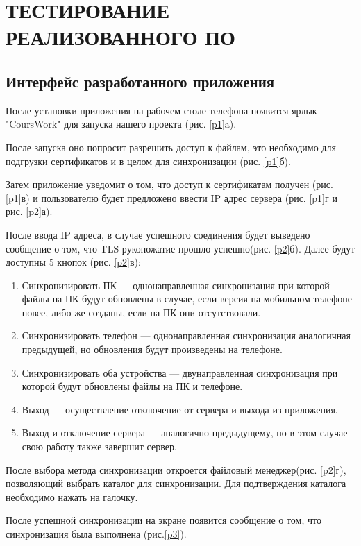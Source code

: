 \section{ТЕСТИРОВАНИЕ РЕАЛИЗОВАННОГО ПО}
\subsection{Интерфейс разработанного приложения}
После установки приложения на рабочем столе телефона появится ярлык "CoursWork" для запуска нашего проекта (рис. \ref{p1}a).

После запуска оно попросит разрешить доступ к файлам, это необходимо для подгрузки сертификатов и в целом для синхронизации (рис. \ref{p1}б).

Затем приложение уведомит о том, что доступ к сертификатам получен (рис. \ref{p1}в) и пользователю будет предложено ввести IP адрес сервера (рис. \ref{p1}г и рис. \ref{p2}а).

После ввода IP адреса, в случае успешного соединения будет выведено сообщение о том, что TLS рукопожатие прошло успешно(рис. \ref{p2}б). Далее будут доступны 5 кнопок (рис. \ref{p2}в): 
\begin{enumerate}
	\item Синхронизировать ПК --- однонаправленная синхронизация при которой файлы на ПК будут обновлены в случае, если версия на мобильном телефоне новее, либо же созданы, если на ПК они отсутствовали.
	\item Синхронизировать телефон --- однонаправленная синхронизация аналогичная предыдущей, но обновления будут произведены на телефоне.
	\item Синхронизировать оба устройства --- двунаправленная синхронизация при которой будут обновлены файлы на ПК и телефоне.
	\item Выход --- осуществление отключение от сервера и выхода из приложения.
	\item Выход и отключение сервера --- аналогично предыдущему, но в этом случае свою работу также завершит сервер.
\end{enumerate}

После выбора метода синхронизации откроется файловый менеджер(рис. \ref{p2}г), позволяющий выбрать каталог для синхронизации. Для подтверждения каталога необходимо нажать на галочку.

После успешной синхронизации на экране появится сообщение о том, что синхронизация была выполнена (рис.\ref{p3}).



